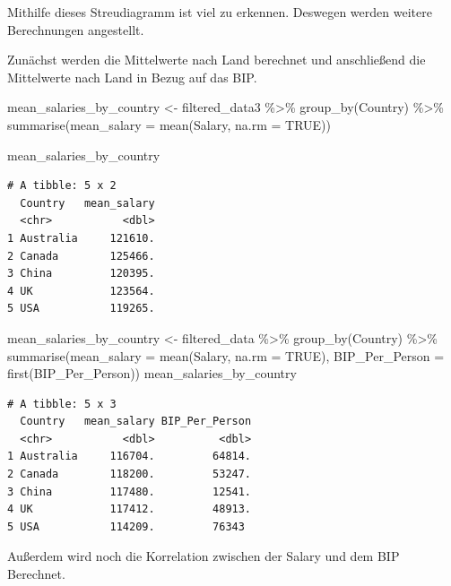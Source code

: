 \documentclass[
  letterpaper,
  DIV=11,
  numbers=noendperiod]{scrartcl}
\newenvironment{Shaded}{\begin{snugshade}}{\end{snugshade}}
\newcommand{\AttributeTok}[1]{\textcolor[rgb]{0.40,0.45,0.13}{#1}}
\newcommand{\ConstantTok}[1]{\textcolor[rgb]{0.56,0.35,0.01}{#1}}
\newcommand{\FunctionTok}[1]{\textcolor[rgb]{0.28,0.35,0.67}{#1}}
\newcommand{\NormalTok}[1]{\textcolor[rgb]{0.00,0.23,0.31}{#1}}
\newcommand{\OtherTok}[1]{\textcolor[rgb]{0.00,0.23,0.31}{#1}}
\newcommand{\SpecialCharTok}[1]{\textcolor[rgb]{0.37,0.37,0.37}{#1}}
\begin{document}
Mithilfe dieses Streudiagramm ist viel zu erkennen. Deswegen werden
weitere Berechnungen angestellt.

Zunächst werden die Mittelwerte nach Land berechnet und anschließend die
Mittelwerte nach Land in Bezug auf das BIP.

\begin{Shaded}
\begin{Highlighting}[]
\NormalTok{mean\_salaries\_by\_country }\OtherTok{\textless{}{-}}\NormalTok{ filtered\_data3 }\SpecialCharTok{\%\textgreater{}\%}
  \FunctionTok{group\_by}\NormalTok{(Country) }\SpecialCharTok{\%\textgreater{}\%}
  \FunctionTok{summarise}\NormalTok{(}\AttributeTok{mean\_salary =} \FunctionTok{mean}\NormalTok{(Salary, }\AttributeTok{na.rm =} \ConstantTok{TRUE}\NormalTok{))}

\NormalTok{mean\_salaries\_by\_country}
\end{Highlighting}
\end{Shaded}

\begin{verbatim}
# A tibble: 5 x 2
  Country   mean_salary
  <chr>           <dbl>
1 Australia     121610.
2 Canada        125466.
3 China         120395.
4 UK            123564.
5 USA           119265.
\end{verbatim}

\begin{Shaded}
\begin{Highlighting}[]
\NormalTok{mean\_salaries\_by\_country }\OtherTok{\textless{}{-}}\NormalTok{ filtered\_data }\SpecialCharTok{\%\textgreater{}\%}
  \FunctionTok{group\_by}\NormalTok{(Country) }\SpecialCharTok{\%\textgreater{}\%}
  \FunctionTok{summarise}\NormalTok{(}\AttributeTok{mean\_salary =} \FunctionTok{mean}\NormalTok{(Salary, }\AttributeTok{na.rm =} \ConstantTok{TRUE}\NormalTok{),}
            \AttributeTok{BIP\_Per\_Person =} \FunctionTok{first}\NormalTok{(BIP\_Per\_Person))  }
\NormalTok{mean\_salaries\_by\_country}
\end{Highlighting}
\end{Shaded}

\begin{verbatim}
# A tibble: 5 x 3
  Country   mean_salary BIP_Per_Person
  <chr>           <dbl>          <dbl>
1 Australia     116704.         64814.
2 Canada        118200.         53247.
3 China         117480.         12541.
4 UK            117412.         48913.
5 USA           114209.         76343 
\end{verbatim}

Außerdem wird noch die Korrelation zwischen der Salary und dem BIP
Berechnet.
\end{document}
